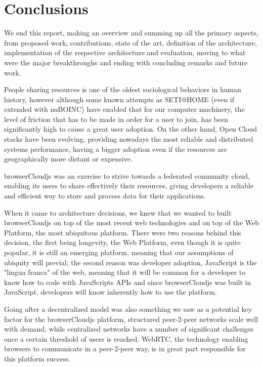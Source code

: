 
%
%

\section{Conclusions}

We end this report, making an overview and summing up all the primary aspects, from proposed work, contributions, state of the art, definition of the architecture, implementation of the respective architecture and evaluation, moving to what were the major breakthroughs and ending with concluding remarks and future work.

People sharing resources is one of the oldest sociological behaviors in human history, however although some known attempts as SETI@HOME (even if extended with nuBOINC) have enabled that for our computer machinery, the level of friction that has to be made in order for a user to join, has been significantly high to cause a great user adoption. On the other hand, Open Cloud stacks have been evolving, providing nowadays the most reliable and distributed systems performance, having a bigger adoption even if the resources are geographically more distant or expensive.

browserCloudjs was an exercise to strive towards a federated community cloud, enabling its users to share effectively their resources, giving developers a reliable and efficient way to store and process data for their applications.

When it came to architecture decisions, we knew that we wanted to built browserCloudjs on top of the most recent web technologies and on top of the Web Platform, the most ubiquitous platform. There were two reasons behind this decision, the first being longevity, the Web Platform, even though it is quite popular, it is still an emerging platform, meaning that our assumptions of ubiquity will previal; the second reason was developer adoption, JavaScript is the "lingua franca" of the web, meaning that it will be common for a developer to know how to code with JavaScripts APIs and since browserCloudjs was built in JavaScript, developers will know inherently how to use the platform.

Going after a decentralized model was also something we saw as a potential key factor for the browserCloudjs platform, structured peer-2-peer networks scale well with demand, while centralized networks have a number of significant challenges once a certain threshold of users is reached. WebRTC, the technology enabling browsers to communicate in a peer-2-peer way, is in great part responsible for this platform success.


